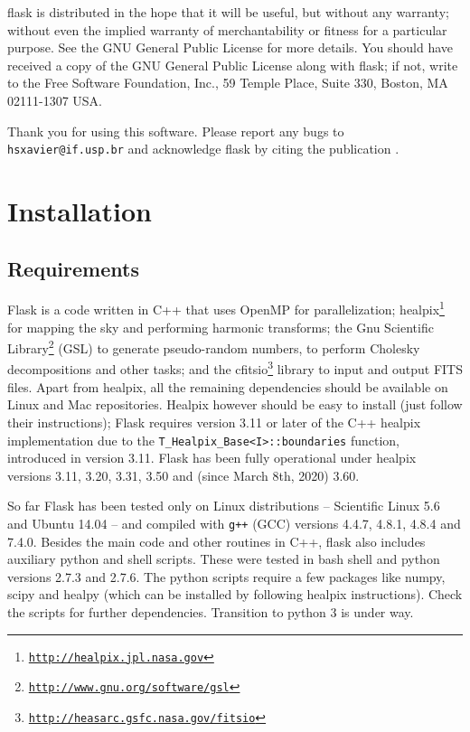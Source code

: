 \documentclass[12pt]{book} %
\begin{document}
   {\sc flask} is distributed in the hope that it will be useful,
   but without any warranty; without even the implied warranty of
   merchantability or fitness for a particular purpose. See the
   GNU General Public License for more details. You should have received 
   a copy of the GNU General Public License along with {\sc flask}; if not, 
   write to the Free Software Foundation, Inc., 59 Temple Place, Suite 330, 
   Boston, MA  02111-1307  USA.

   Thank you for using this software. Please report any bugs to {\tt hsxavier@if.usp.br} and
   acknowledge {\sc flask} by citing the publication \citet{Xavier16mn}.
   

\chapter{Installation}
\label{sec:installation}

\section{Requirements}
\label{sec:requirements}

{\sc Flask} is a code written in {\sc C++} that uses {\sc OpenMP} for parallelization; 
{\sc healpix}\footnote{{\tt \href{http://healpix.jpl.nasa.gov}{http://healpix.jpl.nasa.gov}}} for 
mapping the sky and performing harmonic transforms; the Gnu Scientific 
Library\footnote{{\tt \href{http://www.gnu.org/software/gsl}{http://www.gnu.org/software/gsl}}} 
({\sc GSL}) to generate pseudo-random numbers, to perform Cholesky decompositions and other tasks; and the 
{\sc cfitsio}\footnote{{\tt \href{http://heasarc.gsfc.nasa.gov/fitsio}{http://heasarc.gsfc.nasa.gov/fitsio}}} 
library to input and output FITS files. Apart from {\sc healpix}, all the remaining dependencies should 
be available on Linux and Mac repositories. {\sc Healpix} however should be easy to install (just 
follow their instructions); {\sc Flask} requires version 3.11 or later of the C++ {\sc healpix} 
implementation due to the {\tt T\_Healpix\_Base<I>::boundaries} function, introduced in version 3.11. 
{\sc Flask} has been fully operational under {\sc healpix} versions 3.11, 3.20, 3.31, 3.50 and
(since March 8th, 2020) 3.60.

So far {\sc Flask} has been tested only on Linux distributions -- Scientific Linux 5.6 and Ubuntu 14.04 -- 
and compiled with {\tt g++} (GCC) versions 4.4.7, 4.8.1, 4.8.4 and 7.4.0.   
Besides the main code and other routines in {\sc C++}, {\sc flask} also includes auxiliary {\sc python} 
and {\sc shell} scripts. These were tested in {\sc bash} shell and {\sc python} versions 2.7.3 and 2.7.6.
The {\sc python} scripts require a few packages like {\sc numpy}, {\sc scipy} and {\sc healpy} 
(which can be installed by following {\sc healpix} instructions). Check the scripts for further dependencies.  
Transition to {\sc python} 3 is under way.
\end{document}
